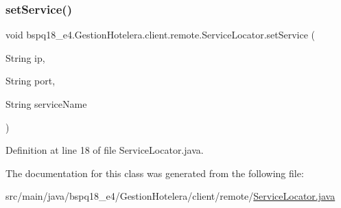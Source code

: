 \subsubsection{\texorpdfstring{set\+Service()}{setService()}}
{\footnotesize\ttfamily void bspq18\+\_\+e4.\+Gestion\+Hotelera.\+client.\+remote.\+Service\+Locator.\+set\+Service (\begin{DoxyParamCaption}\item[{String}]{ip,  }\item[{String}]{port,  }\item[{String}]{service\+Name }\end{DoxyParamCaption})}



Definition at line 18 of file Service\+Locator.\+java.



The documentation for this class was generated from the following file\+:\begin{DoxyCompactItemize}
\item 
src/main/java/bspq18\+\_\+e4/\+Gestion\+Hotelera/client/remote/\mbox{\hyperlink{_service_locator_8java}{Service\+Locator.\+java}}\end{DoxyCompactItemize}
